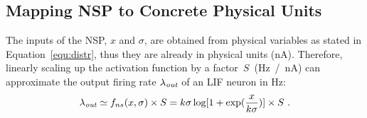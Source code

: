 %	

	\subsection{Mapping NSP to Concrete Physical Units}
	\label{sec:af_model}
	The inputs of the NSP, $x$ and $\sigma$, are obtained from physical variables as stated in Equation~\ref{equ:distr}, thus they are already in physical units (nA).
	Therefore, linearly scaling up the activation function by a factor~$S$~(Hz~/~nA) can approximate the output firing rate $\lambda_{\textit{\textrm{out}}}$ of an LIF neuron in Hz:
	\begin{equation}
	\lambda_{\textit{\textrm{out}}} \simeq f_{ns}(x, \sigma) \times S = k \sigma \log [1 + \exp(\frac{x}{k \sigma})] \times S~.
	\label{equ:fit}
	\end{equation}	

